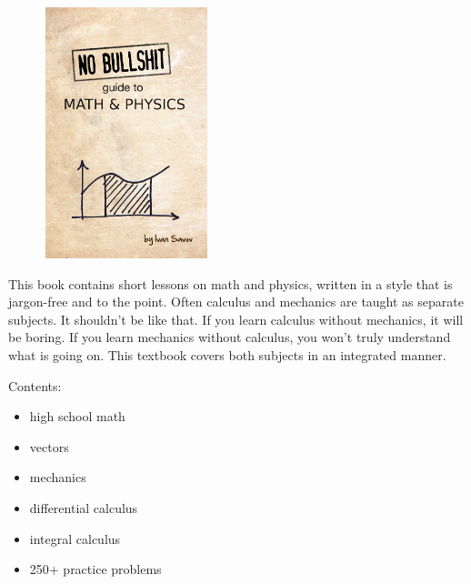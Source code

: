 \documentclass[9pt, onecolumn]{IEEEtran}
\begin{document}
% 



\begin{figure}
\includegraphics[width=135pt,height=207pt]{figures/cover_v40_noline_lite.png}
\end{figure}

    This book contains short lessons on math and physics,
    written in a style that is jargon-free and to the point.
    Often calculus and mechanics are taught as separate subjects.
    It shouldn't be like that.
    If you learn calculus without mechanics, it will be boring.
    If you learn mechanics without calculus, you won't truly understand what is going on.
    This textbook covers both subjects in an integrated manner.
    
Contents:
\begin{itemize}
  \item {\sc high school math}%
  \item {\sc vectors}%
  \item {\sc mechanics} 
  \item {\sc differential calculus}%
  \item {\sc integral calculus}%
  \item 250+ practice problems %
\end{itemize}
\end{document}

